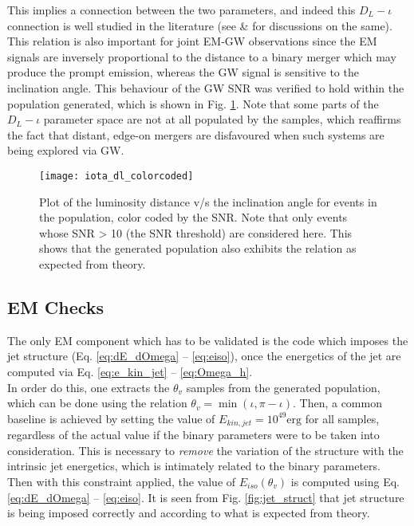         This implies a connection between the two parameters, and indeed this $D_L-\iota
        $ connection is well studied in the literature (see \cite{schutz_2011} \&
        \cite{seto_2015} for discussions on the same). This relation is also important
        for joint EM-GW observations since the EM signals are inversely proportional to
        the distance to a binary merger which may produce the prompt emission, whereas
        the GW signal is sensitive to the inclination angle. This behaviour of the GW
        SNR was verified to hold within the population generated, which is shown in Fig.
        \ref{fig:dl_iota_correlation}. Note that some parts of the $D_L - \iota$
        parameter space are not at all populated by the samples, which reaffirms the
        fact that distant, edge-on mergers are disfavoured when such systems are being
        explored via GW.

        \begin{figure}[htpb]
            \centering
            \texttt{[image: iota\_dl\_colorcoded]}
            \caption[$D_L-\iota$ correlation in the population]{
                Plot of the luminosity distance v/s the inclination angle for events in
                the population, color coded by the SNR. Note that only events whose SNR
                > 10 (the SNR threshold) are considered here.  This shows that the
                generated population also exhibits the relation as expected from theory.
            }
            \label{fig:dl_iota_correlation}
        \end{figure}

    \subsection{EM Checks}\label{sub:em_checks}

    The only EM component which has to be validated is the code which imposes the jet
    structure (Eq. \ref{eq:dE_dOmega} -- \ref{eq:eiso}), once the energetics of the jet
    are computed via Eq. \ref{eq:e_kin_jet} -- \ref{eq:Omega_h}.\\
    In order do this, one extracts the $\theta_v$ samples from the generated population,
    which can be done using the relation $\theta_v = \min(\iota, \pi - \iota)$. Then, a
    common baseline is achieved by setting the value of $E_{kin, jet} = 10^{49} \text{
    erg}$ for all samples, regardless of the actual value if the binary parameters were
    to be taken into consideration. This is necessary to \emph{remove} the variation of
    the structure with the intrinsic jet energetics, which is intimately related to the
    binary parameters.\\
    Then with this constraint applied, the value of $E_{iso}(\theta_v)$ is computed
    using Eq.  \ref{eq:dE_dOmega} -- \ref{eq:eiso}. It is seen from Fig.
    \ref{fig:jet_struct} that jet structure is being imposed correctly and according to
    what is expected from theory.

